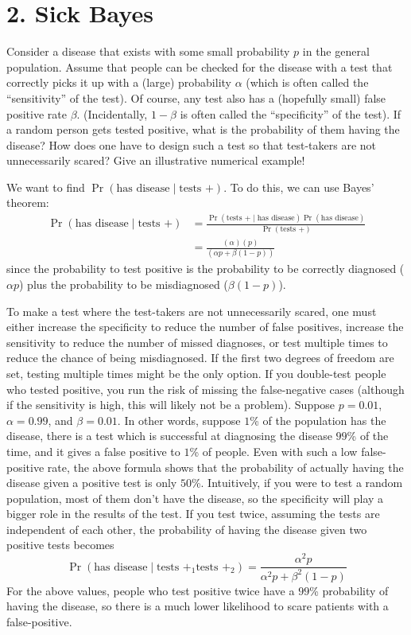 \documentclass[a4paper,twoside]{article}
\begin{document}
\section*{2. Sick Bayes}
Consider a disease that exists with some small probability $ p $ in the general population. Assume that people can be checked for the disease with a test that correctly picks it up with a (large) probability $ \alpha $ (which is often called the “sensitivity” of the test). Of course, any test also has a (hopefully small) false positive rate $ \beta $. (Incidentally, $ 1 - \beta $ is often called the “specificity” of the test). If a random person gets tested positive, what is the probability of them having the disease? How does one have to design such a test so that test-takers are not unnecessarily scared? Give an illustrative numerical example!
\begin{problem}
    We want to find $ \Pr(\text{has disease}\mid\text{tests +}) $. To do this, we can use Bayes' theorem:
    \begin{align}
        \Pr(\text{has disease}\mid\text{tests +}) &= \frac{\Pr(\text{tests +}\mid\text{has disease}) \Pr(\text{has disease})}{\Pr(\text{tests +})} \\
        &= \frac{(\alpha)(p)}{(\alpha p + \beta (1-p))} 
    \end{align}
    since the probability to test positive is the probability to be correctly diagnosed ($ \alpha p $) plus the probability to be misdiagnosed ($ \beta (1-p) $).


    To make a test where the test-takers are not unnecessarily scared, one must either increase the specificity to reduce the number of false positives, increase the sensitivity to reduce the number of missed diagnoses, or test multiple times to reduce the chance of being misdiagnosed. If the first two degrees of freedom are set, testing multiple times might be the only option. If you double-test people who tested positive, you run the risk of missing the false-negative cases (although if the sensitivity is high, this will likely not be a problem). 
    Suppose $ p = 0.01 $, $ \alpha = 0.99 $, and $ \beta = 0.01 $. In other words, suppose $ 1 $\% of the population has the disease, there is a test which is successful at diagnosing the disease $ 99 $\% of the time, and it gives a false positive to $ 1 $\% of people. Even with such a low false-positive rate, the above formula shows that the probability of actually having the disease given a positive test is only $ 50 $\%. Intuitively, if you were to test a random population, most of them don't have the disease, so the specificity will play a bigger role in the results of the test. If you test twice, assuming the tests are independent of each other, the probability of having the disease given two positive tests becomes
    \begin{equation}
        \Pr(\text{has disease}\mid\text{tests +}_1\text{tests +}_2) = \frac{\alpha^2 p}{\alpha^2 p + \beta^2 (1-p)} 
    \end{equation}
    For the above values, people who test positive twice have a $ 99 $\% probability of having the disease, so there is a much lower likelihood to scare patients with a false-positive.
\end{problem}
\end{document}
